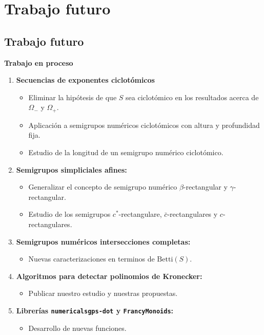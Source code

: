 \documentclass[10pt,compress]{beamer}
\begin{document}
\section{Trabajo futuro}

\subsection{Trabajo futuro}

\begin{frame}
  \begin{center}
    {\color{ChetwodeBlue}\Large\textbf{Trabajo en proceso}}
  \end{center}
  \vspace{-3mm}
  \begin{enumerate}
  \item \textbf{Secuencias de exponentes ciclotómicos}
    \begin{itemize}
    \item Eliminar la hipótesis de que $S$ sea ciclotómico en los resultados acerca de $\Omega_-$ y
      $\Omega_+$.
    \item Aplicación a semigrupos numéricos ciclotómicos con altura y profundidad fija.
    \item Estudio de la longitud de un semigrupo numérico ciclotómico.
    \end{itemize}
  \item \textbf{Semigrupos simpliciales afines:}
    \begin{itemize}
    \item Generalizar el concepto de semigrupo numérico $\beta$-rectangular y $\gamma$-rectangular.
    \item Estudio de los semigrupos $c^{*}$-rectangulare, $\bar{c}$-rectangulares y
      $c$-rectangulares.
    \end{itemize}
  \item \textbf{Semigrupos numéricos intersecciones completas:}
    \begin{itemize}
    \item Nuevas caracterizaciones en terminos de $\mathrm{Betti}(S)$.
    \end{itemize}
  \item \textbf{Algoritmos para detectar polinomios de Kronecker:}
    \begin{itemize}
    \item Publicar nuestro estudio y nuestras propuestas.
    \end{itemize}
  \item \textbf{Librerías \texttt{numericalsgps-dot} y \texttt{FrancyMonoids}:}    
    \begin{itemize}
    \item Desarrollo de nuevas funciones.
    \end{itemize}
  \end{enumerate}
\end{frame}
\end{document}
